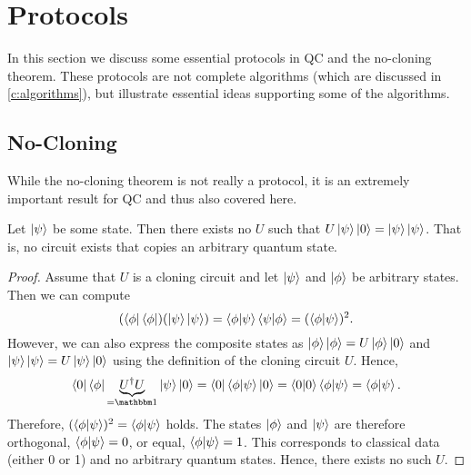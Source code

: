 	\section{Protocols}
		\label{sec:protocols}

		In this section we discuss some essential protocols in \ac{QC} and the no-cloning theorem. These protocols are not complete algorithms (which are discussed in \autoref{c:algorithms}), but illustrate essential ideas supporting some of the algorithms.

		\subsection{No-Cloning}
			While the no-cloning theorem is not really a protocol, it is an extremely important result for \ac{QC} and thus also covered here.

			\begin{theorem}[No-Cloning]
				Let \(\ket{\psi}\) be some state. Then there exists no \(U\) such that \( U \ket{\psi} \ket{0} = \ket{\psi}\ket{\psi} \). That is, no circuit exists that copies an arbitrary quantum state.
			\end{theorem}
			\begin{proof}
				Assume that \(U\) is a cloning circuit and let \(\ket{\psi}\) and \(\ket{\phi}\) be arbitrary states. Then we can compute
				\begin{equation}
					(\bra{\phi}\bra{\phi}) (\ket{\psi}\ket{\psi})
					= \ip{\phi}{\psi} \ip{\psi}{\phi}
					= (\ip{\phi}{\psi})^2.
				\end{equation}
				However, we can also express the composite states as \( \ket{\phi}\ket{\phi} = U \ket{\phi}\ket{0} \) and \( \ket{\psi}\ket{\psi} = U \ket{\psi}\ket{0} \) using the definition of the cloning circuit \(U\). Hence,
				\begin{equation}
					\bra{0}\bra{\phi} \underbrace{U^\dagger U}_{= \ID} \ket{\psi}\ket{0}
					= \bra{0}\bra{\phi} \ket{\psi}\ket{0}
					= \ip{0}{0} \ip{\phi}{\psi}
					= \ip{\phi}{\psi}.
				\end{equation}
				Therefore, \( (\ip{\phi}{\psi})^2 = \ip{\phi}{\psi} \) holds. The states \(\ket{\phi}\) and \(\ket{\psi}\) are therefore orthogonal, \( \ip{\phi}{\psi} = 0 \), or equal, \( \ip{\phi}{\psi} = 1 \). This corresponds to classical data (either \num{0} or \num{1}) and no arbitrary quantum states. Hence, there exists no such \(U\).
			\end{proof}

